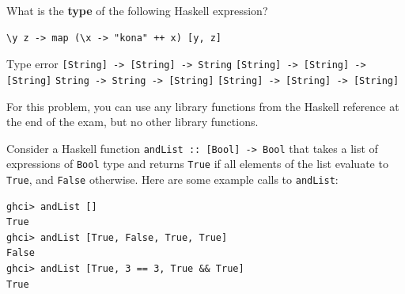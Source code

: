 \documentclass[addpoints]{exam}
\begin{document}
\begin{questions}
\question[3] What is the \textbf{type} of the following Haskell expression?
\begin{verbatim}
\y z -> map (\x -> "kona" ++ x) [y, z]
\end{verbatim}
\begin{checkboxes}
  \choice Type error
  \choice \texttt{[String] -> [String] -> String}
  \choice \texttt{[String] -> [String] -> [String]}
  \CorrectChoice \texttt{String -> String -> [String]}
  \choice \texttt{[String] -> [String] -> [String]}
\end{checkboxes}

\newpage

\question For this problem, you can use any library functions from the Haskell reference at the end of the exam, but no other library functions.

Consider a Haskell function \verb|andList :: [Bool] -> Bool| that takes a list of expressions of \verb|Bool| type and returns \verb|True| if all elements of the list evaluate to \verb|True|, and \verb|False| otherwise.  Here are some example calls to \verb|andList|:

\begin{verbatim}
ghci> andList []
True
ghci> andList [True, False, True, True]
False
ghci> andList [True, 3 == 3, True && True]
True
\end{verbatim}

\end{questions}
\end{document}
